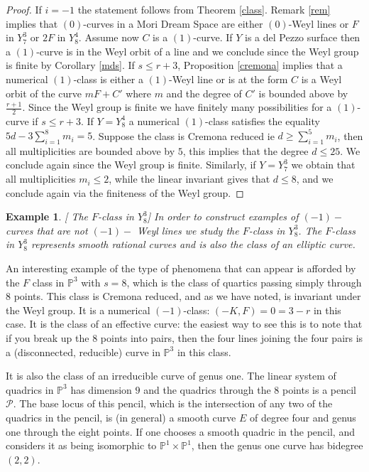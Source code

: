\documentclass[12pt]{article}
\newtheorem{example}[equation]{Example}
\numberwithin{equation}{section}
\numberwithin{subeq}{equation}
\def\bbP{\mathbb{P}}
\begin{document}
\begin{proof}
If $i= -1$ the statement follows from Theorem \ref{class}.
Remark \ref{rem} implies that $(0)$-curves in a Mori Dream Space are either $(0)$-Weyl lines
 or $F$ in $Y^{3}_{7}$ or $2F$ in $Y^{4}_{8}$. 
Assume now $C$ is a $(1)$-curve.
If $Y$ is a del Pezzo surface then a $(1)$-curve is in the Weyl orbit of a line
and we conclude since the Weyl group is finite by Corollary \ref{mds}.
If $s\leq r+3$, Proposition \ref{cremona} implies that a numerical $(1)$-class is either a $(1)$-Weyl line or is at the form $C$ is a Weyl orbit of the curve $mF+C'$ where $m$ and the degree of $C'$ is bounded above by $\frac{r+1}{2}$. Since the Weyl group is finite we have finitely many possibilities for a $(1)$-curve if $s\leq r+3$. If $Y=Y^4_8$ a numerical $(1)$-class satisfies the equality $5d-3\sum_{i=1}^{8}m_i=5$. Suppose the class is Cremona reduced ie $d\geq \sum_{i=1}^{5} m_i$, then all multiplicities are bounded above by $5$, this implies that the degree $d \leq 25$. We conclude again since the Weyl group is finite. Similarly, if $Y=Y^3_7$ we obtain that all multiplicities $m_i\leq 2$, while the linear invariant gives that $d \leq 8$, and we conclude again via the finiteness of the Weyl group.

\end{proof}

\begin{example}\label{F class in 3}[ The $F$-class in $Y^3_8$] 
In order to construct examples of $(-1)-$curves 
that are not $(-1)-$ Weyl lines 
we study the $F$-class in $Y^3_8$. 
The $F$-class in $Y^3_8$ represents smooth rational curves 
and is also the class of an elliptic curve.
\end{example}
An interesting example of the type of phenomena that can appear
is afforded by the $F$ class in $\bbP^3$ with $s=8$,
which is the class of quartics passing simply through $8$ points.
This class is Cremona reduced, and as we have noted, is invariant under the Weyl group.
It is a numerical $(-1)$-class: $(-K, F) = 0 = 3-r$ in this case.
It is the class of an effective curve: the easiest way to see this is to note that if you break up the $8$ points into pairs, then the four lines joining the four pairs is a (disconnected, reducible) curve in $\bbP^3$ in this class.

It is also the class of an irreducible curve of genus one.
The linear system of quadrics in $\bbP^3$ has dimension $9$
and the quadrics through the $8$ points is a pencil $\mathcal{P}$.
The base locus of this pencil, which is the intersection of any two of the quadrics in the pencil,
is (in general) a smooth curve $E$ of degree four and genus one through the eight points.
If one chooses a smooth quadric in the pencil,
and considers it as being isomorphic to $\bbP^1\times\bbP^1$,
then the genus one curve has bidegree $(2,2)$.
\end{document}
